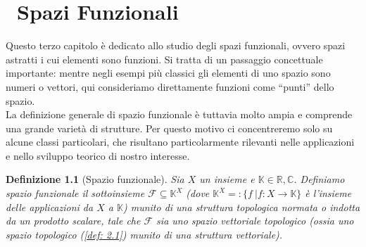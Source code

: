 \documentclass[a4paper,12pt]{report}
\newtheorem{definizione}{Definizione}[chapter]
\begin{document}
\newpage

\chapter{\ Spazi Funzionali}


Questo terzo capitolo è dedicato allo studio degli spazi funzionali, ovvero spazi astratti i cui elementi sono funzioni. Si tratta di un passaggio concettuale importante: mentre negli esempi più classici gli elementi di uno spazio sono numeri o vettori, qui consideriamo direttamente funzioni come “punti” dello spazio.
\\La definizione generale di spazio funzionale è tuttavia molto ampia e comprende una grande varietà di strutture. Per questo motivo ci concentreremo solo su alcune classi particolari, che risultano particolarmente rilevanti nelle applicazioni e nello sviluppo teorico di nostro interesse.

\begin{definizione}[Spazio funzionale]
Sia $X$ un insieme e $\mathbb{K} \in {\mathbb{R}, \mathbb{C}}$. Definiamo spazio funzionale il sottoinsieme $\mathscr{F}\subseteq\mathbb{K}^X$ (dove $\mathbb{K}^X=:\{f \ |f:X \to \mathbb{K}\}$ è l'insieme delle applicazioni da $X$ a $\mathbb{K}$) munito di una struttura topologica normata o indotta da un prodotto scalare, tale che $\mathscr{F}$ sia uno spazio vettoriale topologico (ossia uno spazio topologico (\ref{def: 2.1}) munito di una struttura vettoriale).
\end{definizione}
\end{document}

